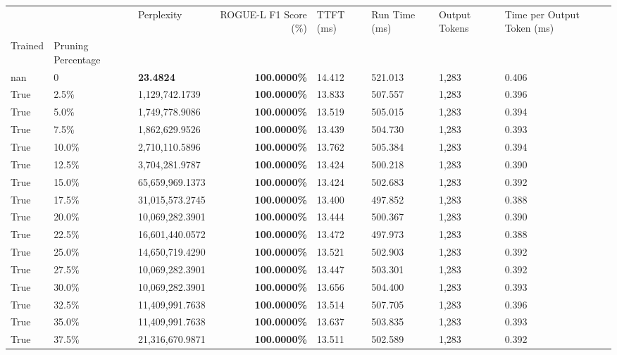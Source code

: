 \begin{table}[H]
\begin{tabular}{lllrllll}
\toprule
 &  & Perplexity & ROGUE-L F1 Score (\%) & TTFT (ms) & Run Time (ms) & Output Tokens & Time per Output Token (ms) \\
Trained & Pruning Percentage &  &  &  &  &  &  \\
\midrule
nan & 0 & \bfseries 23.4824 & \bfseries 100.0000\% & 14.412 & 521.013 & 1,283 & 0.406 \\
\cline{1-8}
True & 2.5\% & 1,129,742.1739 & \bfseries \color{red} 100.0000\% & 13.833 & 507.557 & 1,283 & 0.396 \\
\cline{1-8}
True & 5.0\% & 1,749,778.9086 & \bfseries \color{red} 100.0000\% & 13.519 & 505.015 & 1,283 & 0.394 \\
\cline{1-8}
True & 7.5\% & 1,862,629.9526 & \bfseries \color{red} 100.0000\% & 13.439 & 504.730 & 1,283 & 0.393 \\
\cline{1-8}
True & 10.0\% & 2,710,110.5896 & \bfseries \color{red} 100.0000\% & 13.762 & 505.384 & 1,283 & 0.394 \\
\cline{1-8}
True & 12.5\% & 3,704,281.9787 & \bfseries \color{red} 100.0000\% & 13.424 & 500.218 & 1,283 & 0.390 \\
\cline{1-8}
True & 15.0\% & 65,659,969.1373 & \bfseries \color{red} 100.0000\% & 13.424 & 502.683 & 1,283 & 0.392 \\
\cline{1-8}
True & 17.5\% & 31,015,573.2745 & \bfseries \color{red} 100.0000\% & 13.400 & 497.852 & 1,283 & 0.388 \\
\cline{1-8}
True & 20.0\% & 10,069,282.3901 & \bfseries \color{red} 100.0000\% & 13.444 & 500.367 & 1,283 & 0.390 \\
\cline{1-8}
True & 22.5\% & 16,601,440.0572 & \bfseries \color{red} 100.0000\% & 13.472 & 497.973 & 1,283 & 0.388 \\
\cline{1-8}
True & 25.0\% & 14,650,719.4290 & \bfseries \color{red} 100.0000\% & 13.521 & 502.903 & 1,283 & 0.392 \\
\cline{1-8}
True & 27.5\% & 10,069,282.3901 & \bfseries \color{red} 100.0000\% & 13.447 & 503.301 & 1,283 & 0.392 \\
\cline{1-8}
True & 30.0\% & 10,069,282.3901 & \bfseries \color{red} 100.0000\% & 13.656 & 504.400 & 1,283 & 0.393 \\
\cline{1-8}
True & 32.5\% & 11,409,991.7638 & \bfseries \color{red} 100.0000\% & 13.514 & 507.705 & 1,283 & 0.396 \\
\cline{1-8}
True & 35.0\% & 11,409,991.7638 & \bfseries \color{red} 100.0000\% & 13.637 & 503.835 & 1,283 & 0.393 \\
\cline{1-8}
True & 37.5\% & 21,316,670.9871 & \bfseries \color{red} 100.0000\% & 13.511 & 502.589 & 1,283 & 0.392 \\

\end{tabular}
\end{table}
